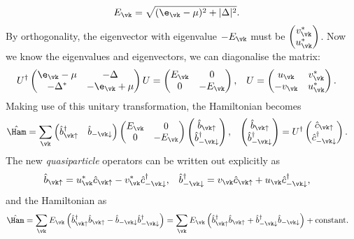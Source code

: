 \documentclass[a4paper, 11pt, normalem]{report}
\begin{document}
\begin{align}
    E_{\vk} &= \sqrt{(\e_{\vk}-\mu)^2+|\Delta|^2}.
\end{align}
By orthogonality, the eigenvector with eigenvalue $-E_{\vk}$ must be $\begin{pmatrix} v_{\vk}^* \\ u_{\vk}^*\end{pmatrix}$.
Now we know the eigenvalues and eigenvectors, we can diagonalise the matrix:
\begin{align}
    U^\dagger \begin{pmatrix}\e_{\vk}-\mu & -\Delta \\ -\Delta^* & -\e_{\vk}+\mu\end{pmatrix}U &= \begin{pmatrix}E_{\vk} & 0 \\ 0 & -E_{\vk}\end{pmatrix}, & U &= \begin{pmatrix} u_{\vk} & v_{\vk}^* \\ -v_{\vk} & u_{\vk}^* \end{pmatrix}.
\end{align}
Making use of this unitary transformation, the Hamiltonian becomes
\begin{align}
    \hat{\Ham} &= \sum_{\vk} \begin{pmatrix} \hat{b}_{\vk\uparrow}^\dagger & \hat{b}_{-\vk\downarrow}\end{pmatrix}\begin{pmatrix} E_{\vk} & 0 \\ 0 & -E_{\vk}\end{pmatrix}\begin{pmatrix}\hat{b}_{\vk\uparrow} \\ \hat{b}_{-\vk\downarrow}^\dagger\end{pmatrix}, & \begin{pmatrix} \hat{b}_{\vk\uparrow} \\ \hat{b}_{-\vk\downarrow}^\dagger \end{pmatrix} &= U^\dagger\begin{pmatrix}\hat{c}_{\vk\uparrow} \\ \hat{c}_{-\vk\downarrow}^\dagger\end{pmatrix}.
\end{align}
The new \emph{quasiparticle} operators can be written out explicitly as
\begin{align}
    \hat{b}_{\vk\uparrow} &= u_{\vk}^*\hat{c}_{\vk\uparrow}-v_{\vk}^*\hat{c}_{-\vk\downarrow}^\dagger, & \hat{b}_{-\vk\downarrow}^\dagger &= v_{\vk}\hat{c}_{\vk\uparrow}+u_{\vk}\hat{c}_{-\vk\downarrow}^\dagger,
\end{align}
and the Hamiltonian as
\begin{align}
    \hat{\Ham} &= \sum_{\vk} E_{\vk}\left(\hat{b}_{\vk\uparrow}^\dagger\hat{b}_{\vk\uparrow}-\hat{b}_{-\vk\downarrow}\hat{b}_{-\vk\downarrow}^\dagger\right) = \sum_{\vk} E_{\vk}\left(\hat{b}_{\vk\uparrow}^\dagger\hat{b}_{\vk\uparrow}+\hat{b}_{-\vk\downarrow}^\dagger\hat{b}_{-\vk\downarrow}\right) + \text{constant}.
\end{align}
\end{document}
